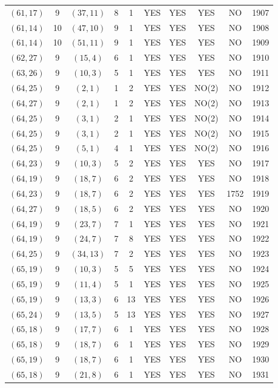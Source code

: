\begin{longtable}{|c|c|c|c|c|c|c|c|c|c|}
$(61, 17)$ & 9 & $(37, 11)$ & 8 & 1 & YES & YES & YES & NO & 1907\\
$(61, 14)$ & 10 & $(47, 10)$ & 9 & 1 & YES & YES & YES & NO & 1908\\
$(61, 14)$ & 10 & $(51, 11)$ & 9 & 1 & YES & YES & YES & NO & 1909\\
$(62, 27)$ & 9 & $(15, 4)$ & 6 & 1 & YES & YES & YES & NO & 1910\\
$(63, 26)$ & 9 & $(10, 3)$ & 5 & 1 & YES & YES & YES & NO & 1911\\
$(64, 25)$ & 9 & $(2, 1)$ & 1 & 2 & YES & YES & NO(2) & NO & 1912\\
$(64, 27)$ & 9 & $(2, 1)$ & 1 & 2 & YES & YES & NO(2) & NO & 1913\\
$(64, 25)$ & 9 & $(3, 1)$ & 2 & 1 & YES & YES & NO(2) & NO & 1914\\
$(64, 25)$ & 9 & $(3, 1)$ & 2 & 1 & YES & YES & NO(2) & NO & 1915\\
$(64, 25)$ & 9 & $(5, 1)$ & 4 & 1 & YES & YES & NO(2) & NO & 1916\\
$(64, 23)$ & 9 & $(10, 3)$ & 5 & 2 & YES & YES & YES & NO & 1917\\
$(64, 19)$ & 9 & $(18, 7)$ & 6 & 2 & YES & YES & YES & NO & 1918\\
$(64, 23)$ & 9 & $(18, 7)$ & 6 & 2 & YES & YES & YES & 1752 & 1919\\
$(64, 27)$ & 9 & $(18, 5)$ & 6 & 2 & YES & YES & YES & NO & 1920\\
$(64, 19)$ & 9 & $(23, 7)$ & 7 & 1 & YES & YES & YES & NO & 1921\\
$(64, 19)$ & 9 & $(24, 7)$ & 7 & 8 & YES & YES & YES & NO & 1922\\
$(64, 25)$ & 9 & $(34, 13)$ & 7 & 2 & YES & YES & YES & NO & 1923\\
$(65, 19)$ & 9 & $(10, 3)$ & 5 & 5 & YES & YES & YES & NO & 1924\\
$(65, 19)$ & 9 & $(11, 4)$ & 5 & 1 & YES & YES & YES & NO & 1925\\
$(65, 19)$ & 9 & $(13, 3)$ & 6 & 13 & YES & YES & YES & NO & 1926\\
$(65, 24)$ & 9 & $(13, 5)$ & 5 & 13 & YES & YES & YES & NO & 1927\\
$(65, 18)$ & 9 & $(17, 7)$ & 6 & 1 & YES & YES & YES & NO & 1928\\
$(65, 18)$ & 9 & $(18, 7)$ & 6 & 1 & YES & YES & YES & NO & 1929\\
$(65, 19)$ & 9 & $(18, 7)$ & 6 & 1 & YES & YES & YES & NO & 1930\\
$(65, 18)$ & 9 & $(21, 8)$ & 6 & 1 & YES & YES & YES & NO & 1931\\

\end{longtable}
